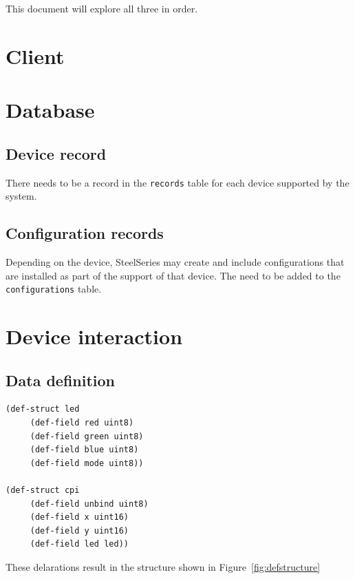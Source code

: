 \documentclass[12pt]{report}
\begin{document}
This document will explore all three in order.


\chapter{Client}



\chapter{Database}

\section{Device record}

There needs to be a record in the \verb|records| table for each device
supported by the system.

\section{Configuration records}

Depending on the device, SteelSeries may create and include
configurations that are installed as part of the support of that
device. The need to be added to the \verb|configurations| table.



\chapter{Device interaction}



\section{Data definition}

\begin{verbatim}
(def-struct led
     (def-field red uint8)
     (def-field green uint8)
     (def-field blue uint8)
     (def-field mode uint8))

(def-struct cpi
     (def-field unbind uint8)
     (def-field x uint16)
     (def-field y uint16)
     (def-field led led))
\end{verbatim}

These delarations result in the structure shown in Figure~\ref{fig:defstructure} 
\end{document}
